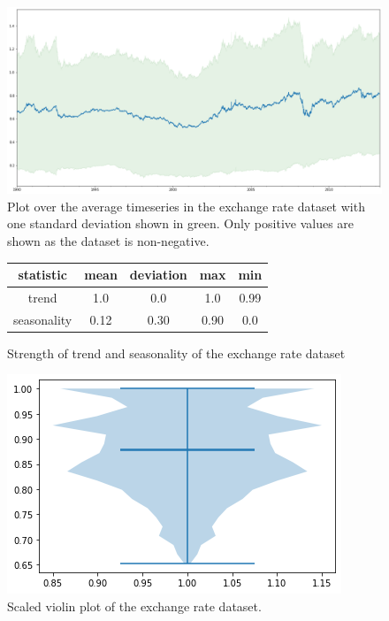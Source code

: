 \begin{figure}[htb]
  \centering
  \includegraphics[width=\linewidth]{./img/exchange_rate_plot.png}
  \caption{Plot over the average timeseries in the exchange rate dataset with one standard deviation shown in green. Only positive values are shown as the dataset is non-negative.}
  \label{fig:exchange_rate_plot}
  \endminipage\hfill
\end{figure}

\begin{figure}[htb]
  \centering
  \begin{center}
    \begin{tabular}{||c | c | c | c | c |}
      \hline
      statistic   & mean & deviation & max  & min  \\
      \hline
      trend       & 1.0  & 0.0       & 1.0  & 0.99 \\
      \hline
      seasonality & 0.12 & 0.30      & 0.90 & 0.0  \\
      \hline
      \hline
    \end{tabular}
    \caption{Strength of trend and seasonality of the exchange rate dataset}
  \end{center}
  \endminipage\hfill
  \includegraphics[width=\linewidth]{./img/exchange_rate_violin.png}
  \caption{Scaled violin plot of the exchange rate dataset.}
  \label{fig:exchange_rate_violin}
  \endminipage\hfill
\end{figure}

